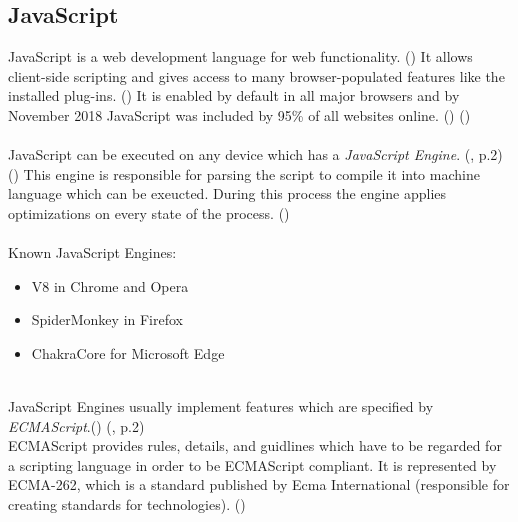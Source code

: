 \subsection{JavaScript}\label{JS}
JavaScript is a web development language for web functionality. (\textcite{wood}) It allows client-side scripting and gives access to many browser-populated features like the installed plug-ins. (\textcite{amiunique}) It is enabled by default in all major browsers and by November 2018 JavaScript was included by 95\% of all websites online. (\textcite{jsinfo}) (\textcite{w3techs18})\\\\
JavaScript can be executed on any device which has a \textit{JavaScript Engine}. (\textcite{mulazzani13}, p.2) (\textcite{jsinfo}) This engine is responsible for parsing the script to compile it into machine language which can be exeucted. During this process the engine applies optimizations on every state of the process. (\textcite{jsinfo})\\\\
Known JavaScript Engines:
\begin{itemize}
	\item V8 in Chrome and Opera
	\item SpiderMonkey in Firefox
	\item ChakraCore for Microsoft Edge\\\\
\end{itemize}
JavaScript Engines usually implement features which are specified by \textit{ECMAScript}.(\textcite{jsinfo}) (\textcite{mulazzani13}, p.2)\\
ECMAScript provides rules, details, and guidlines which have to be regarded for a scripting language in order to be ECMAScript compliant. It is represented by ECMA-262, which is a standard published by Ecma International (responsible for creating standards for technologies). (\textcite{aranda17})\\\\
